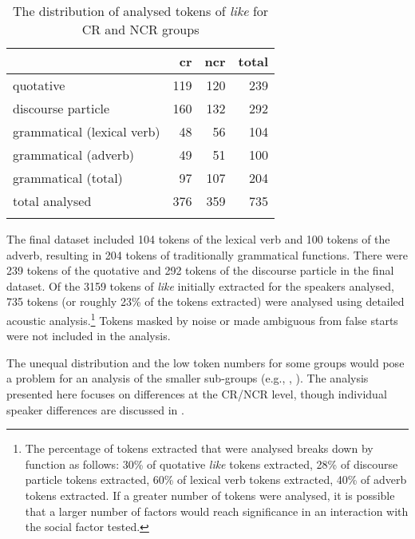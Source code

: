 \begin{table}[t]
\caption{The distribution of analysed tokens of \textit{like} for CR and NCR groups}
  \label{tab:tokensanalysed}
	 \begin{center}
		\begin{tabular}{lrrr}\lsptoprule
	
		& \sc cr 	&	 \sc ncr & \sc total \\
              
  \midrule
  
quotative & 119 & 120 & 239 \\
discourse particle & 160 & 132 & 292 \\
grammatical (lexical verb) & 48 & 56 & 104\\
grammatical (adverb) & 49  & 51 & 100 \\
grammatical (total) & 97 & 107 & 204 \\
total analysed      & 376 & 359 & 735 \\

\lspbottomrule
		\end{tabular}
	
	\end{center}
\end{table}

\newpage
The final dataset included 104 tokens of the lexical verb and 100 tokens of the adverb, resulting in 204 tokens of traditionally grammatical functions. There were 239 tokens of the quotative and 292 tokens of the discourse particle in the final dataset. Of the 3159 tokens of \textit{like} initially extracted for the speakers analysed, 735 tokens (or roughly	23\% of the tokens extracted) were analysed using detailed acoustic analysis.\footnote{The percentage of tokens extracted that were analysed breaks down by function as follows: 30\% of quotative \textit{like} tokens extracted, 28\% of discourse particle tokens extracted, 60\% of lexical verb tokens extracted, 40\% of adverb tokens extracted. If a greater number of tokens were analysed, it is possible that a larger number of factors would reach significance in an interaction with the social factor tested.} Tokens masked by noise or made ambiguous from false starts were not included in the analysis. 

The unequal distribution and the low token numbers for some groups would pose a problem for an analysis of the smaller sub-groups (e.g., , ). The analysis presented here focuses on differences at the CR/NCR level, though individual speaker differences are discussed in .  

